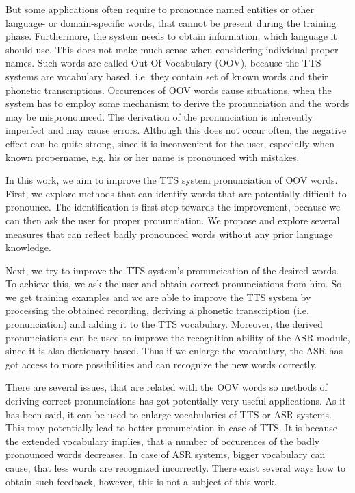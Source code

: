 But some applications often require to pronounce named entities or other language- or domain-specific words, that cannot be present during the training phase.
Furthermore, the system needs to obtain information, which language it should use.
This does not make much sense when considering individual proper names.
Such words are called Out-Of-Vocabulary (OOV), because the TTS systems are vocabulary based, i.e. they contain set of known words and their phonetic transcriptions.
Occurences of OOV words cause situations, when the system has to employ some mechanism to derive the pronunciation and the words may be mispronounced.
The derivation of the pronunciation is inherently imperfect and may cause errors.
Although this does not occur often, the negative effect can be quite strong, since it is inconvenient for the user, especially when known propername, e.g. his or her name is pronounced with mistakes.
\par
In this work, we aim to improve the TTS system pronunciation of OOV words.
First, we explore methods that can identify words that are potentially difficult to pronounce.
The identification is first step towards the improvement, because we can then ask the user for proper pronunciation.
We propose and explore several measures that can reflect badly pronounced words without any prior language knowledge.
\par
Next, we try to improve the TTS system's pronuncication of the desired words.
To achieve this, we ask the user and obtain correct pronunciations from him.
So we get training examples and we are able to improve the TTS system by processing the obtained recording, deriving a phonetic transcription (i.e. pronunciation) and adding it to the TTS vocabulary.
Moreover, the derived pronunciations can be used to improve the recognition ability of the ASR module, since it is also dictionary-based.
Thus if we enlarge the vocabulary, the ASR has got access to more possibilities and can recognize the new words correctly.
\par
There are several issues, that are related with the OOV words so methods of deriving correct pronunciations has got potentially very useful applications.
As it has been said, it can be used to enlarge vocabularies of TTS or ASR systems.
This may potentially lead to better pronunciation in case of TTS.
It is because the extended vocabulary implies, that a number of occurences of the badly pronounced words decreases.
In case of ASR systems, bigger vocabulary can cause, that less words are recognized incorrectly.
There exist several ways how to obtain such feedback, however, this is not a subject of this work.
